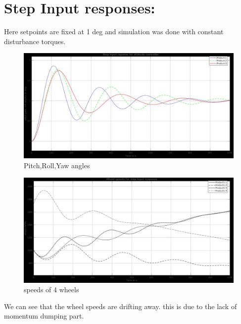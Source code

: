 \documentclass[10pt,a4paper]{report}
\begin{document}
\section{Step Input responses:}
Here setpoints are fixed at 1 deg and simulation was done with constant disturbance torques.
\begin{figure}[H]
	\centering
	\includegraphics[width=1.0\linewidth]{Step_pry}
	\caption{Pitch,Roll,Yaw angles}
	\label{fig:steppry}
\end{figure}
\begin{figure}[H]
	\centering
	\includegraphics[width=1.0\linewidth]{"step_wheel speeds_1"}
	\caption{speeds of 4 wheels}
	\label{fig:stepwheel-speeds1}
\end{figure}
We can see that the wheel speeds are drifting away. this is due to the lack of momentum dumping part.
\end{document}
